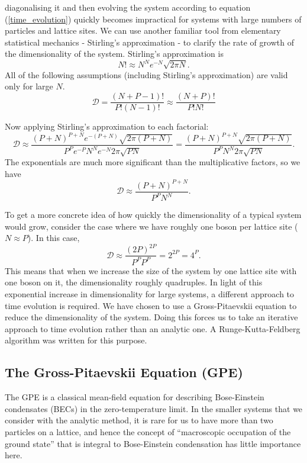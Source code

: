 \documentclass[a4paper,10pt]{article}
\theoremstyle{plain}
\begin{document}
diagonalising it and then evolving the system according to equation 
(\ref{time_evolution}) quickly becomes impractical for systems with large 
numbers of particles and lattice sites. We can use another familiar tool from
elementary statistical mechanics - Stirling's approximation - to clarify the
rate of growth of the dimensionality of the system. Stirling's 
approximation \cite{Schroeder2007} is
\begin{equation}
 N!\approx N^N e^{-N}\sqrt{2\pi N}.
\end{equation}
All of the following assumptions (including Stirling's approximation) are 
valid only for large $N$.
\begin{equation*}
 \mathcal{D}
 =
 \frac{\left(N+P-1\right)!}{P!\left(N-1\right)!}
 \approx
 \frac{\left(N+P\right)!}{P!N!}
\end{equation*}

Now applying Stirling's approximation to each factorial:
\begin{equation*}
 \mathcal{D} 
 \approx
 \frac{\left(P+N\right)^{P+N}e^{-\left(P+N\right)}\sqrt{2\pi(P+N)}}
 {P^P e^{-P} N^N e^{-N} 2\pi \sqrt{PN}}
 =
 \frac{\left(P+N\right)^{P+N}\sqrt{2\pi(P+N)}}
 {P^P N^N 2\pi \sqrt{PN}}.
\end{equation*}
The exponentials are much more significant than the multiplicative factors,
so we have
\begin{equation*}
 \mathcal{D} 
 \approx
 \frac{\left(P+N\right)^{P+N}}
 {P^P N^N}.
\end{equation*}

To get a more concrete idea of how quickly the dimensionality of a typical 
system would grow, consider the case where we have roughly one boson per
lattice site ($N\approx P$). In this case,
\begin{equation*}
 \mathcal{D}
 \approx
 \frac{(2P)^{2P}}{P^P P^P}
 =
 2^{2P}=4^P.
\end{equation*}
This means that when we increase the size of the system by one lattice site 
with one boson on it, the dimensionality roughly quadruples. In light of
this exponential increase in dimensionality for large systems, a different 
approach to time evolution is required. We have chosen to use a 
Gross-Pitaevskii equation to reduce the dimensionality of the system. Doing 
this forces us to take an iterative approach to time evolution rather than an 
analytic one. A Runge-Kutta-Feldberg algorithm \cite{Burden2005} was written 
for this purpose.

\subsection{The Gross-Pitaevskii Equation (GPE)}
The GPE is a classical mean-field equation for describing Bose-Einstein 
condensates (BECs) in the zero-temperature limit. In the smaller systems that 
we consider with the analytic method, it is rare for us to have more than two 
particles on a lattice, and hence the concept of ``macroscopic occupation of 
the ground state'' that is integral to Bose-Einstein condensation has little 
importance here. 
\end{document}
